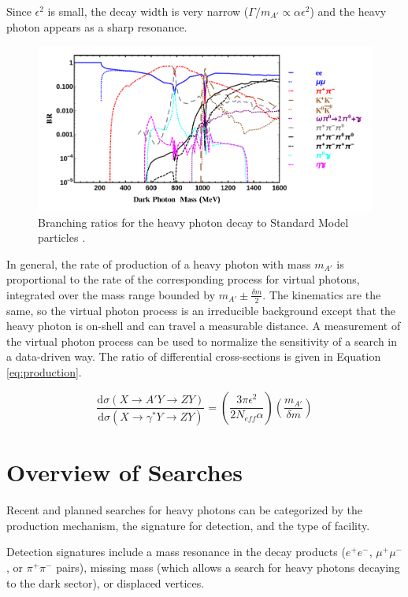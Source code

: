 Since $\epsilon^2$ is small, the decay width is very narrow ($\Gamma/m_{A'}\propto \alpha \epsilon^2$) and the heavy photon appears as a sharp resonance.

\begin{figure}[ht]
    \includegraphics[width=\textwidth]{motivation/figs/darkphoton-BR-1-3000-LOG}
    \caption{Branching ratios for the heavy photon decay to Standard Model particles \cite{liu_signals_2015}.}
    \label{fig:branching}
\end{figure}

In general, the rate of production of a heavy photon with mass $m_{A'}$ is proportional to the rate of the corresponding process for virtual photons, integrated over the mass range bounded by $m_{A'}\pm \frac{\delta m}{2}$.
The kinematics are the same, so the virtual photon process is an irreducible background except that the heavy photon is on-shell and can travel a measurable distance.
A measurement of the virtual photon process can be used to normalize the sensitivity of a search in a data-driven way.
The ratio of differential cross-sections is given in Equation \ref{eq:production}.

\begin{equation}
    \frac{\mathrm{d}\sigma(X \to A' Y \to Z Y)}{\mathrm{d}\sigma(X \to \gamma^* Y \to Z Y)} = \left(\frac{3\pi\epsilon^2}{2N_{eff} \alpha} \right) \left(\frac{m_{A'}}{\delta m} \right)
    \label{eq:production}
\end{equation}

\section{Overview of Searches}
Recent and planned searches for heavy photons can be categorized by the production mechanism, the signature for detection, and the type of facility.

Detection signatures include a mass resonance in the decay products ($e^+e^-$, $\mu^+\mu^-$, or $\pi^+\pi^-$ pairs), missing mass (which allows a search for heavy photons decaying to the dark sector), or displaced vertices.

